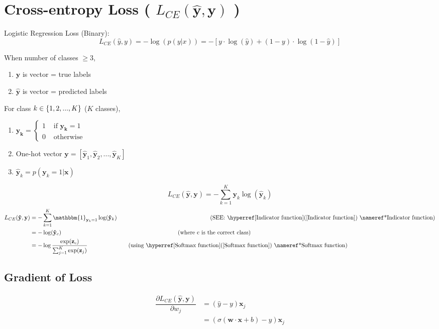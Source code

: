 \section{Cross-entropy Loss ( $L_{CE}(\hat{\mathbf{y}},\mathbf{y})$ ) \cite{nlp-1}}

Logistic Regression Loss (Binary):
\[
    L_{CE}(\hat{y}, y) = -\log(p(y|x)) = -[y\cdot\log(\hat{y})+ (1-y)\cdot\log(1-\hat{y})]
\]

When number of classes $\geq 3$,
\begin{enumerate}
    \item $\mathbf{y}$ is vector = true labels
    \item $\mathbf{\hat{y}}$ is vector = predicted labels
\end{enumerate}

\vspace{0.3cm}
For class $k \in \left\{1,2,...,K\right\}$ ($K$ classes),
\begin{enumerate}
    \item \(\mathbf{y_k} = \begin{cases}
        1 & \text{ if } \mathbf{y_k} = 1 \\
        0 & \text{ otherwise}
    \end{cases}\)
    \item One-hot vector $\mathbf{y} = [\mathbf{\hat{y}}_1, \mathbf{\hat{y}}_2, ..., \mathbf{\hat{y}}_K]$
    \item $\mathbf{\hat{y}}_k = p(\mathbf{y}_k = 1|\mathbf{x})$
\end{enumerate}

\vspace{0.2cm}
\[
    L_{CE}(\mathbf{\hat{y}}, \mathbf{y}) = -\sum_{k=1}^{K} \mathbf{y}_k\log(\mathbf{\hat{y}}_k)
\]
\begin{align*}
    L_{CE}(\mathbf{\hat{y}}, \mathbf{y}) &= -\sum_{k=1}^{K} \mathbbm{1}_{\mathbf{y}_k =1}\log(\mathbf{\hat{y}}_k) 
    \repeatn{16}{\quad} \text{(SEE: \fullref{Indicator function})}\\
    &= -\log(\mathbf{\hat{y}}_c) \repeatn{20}{\quad} \text{(where c is the correct class)}\\
    &= -\log\displaystyle\dfrac{\exp(\mathbf{z}_c)}{\sum_{j=1}^{K} \exp(\mathbf{z}_j)}  \repeatn{7}{\quad} \text{(using \fullref{Softmax function})}
\end{align*}


\subsection{Gradient of Loss}
\begin{align*}
    \dfrac{\partial L_{CE}(\mathbf{\hat{y}}, \mathbf{y})}{\partial w_j} &= (\hat{y} - y) \mathbf{x}_j \\
    &= (\sigma(\mathbf{w} \cdot \mathbf{x} + b) - y) \mathbf{x}_j
\end{align*}

